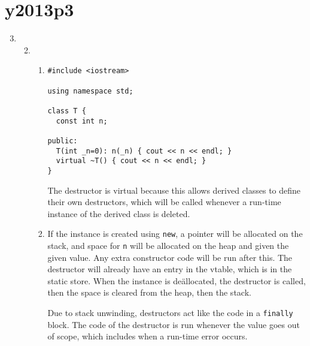 \documentclass{article}
\begin{document}
\section*{y2013p3}
\begin{enumerate}
\setcounter{enumi}{2}
  \item
    \begin{enumerate}
    \setcounter{enumii}{1}
      \item
        \begin{enumerate}
          \item \begin{lstlisting}
#include <iostream>

using namespace std;

class T {
  const int n;

public:
  T(int _n=0): n(_n) { cout << n << endl; }
  virtual ~T() { cout << n << endl; }
}
            \end{lstlisting}
            The destructor is virtual because this allows derived classes to define their own destructors, which will be called whenever a run-time instance of the derived class is deleted.
          \item If the instance is created using \texttt{new}, a pointer will be allocated on the stack, and space for \texttt{n} will be allocated on the heap and given the given value. Any extra constructor code will be run after this. The destructor will already have an entry in the vtable, which is in the static store. When the instance is de\"allocated, the destructor is called, then the space is cleared from the heap, then the stack.

            Due to stack unwinding, destructors act like the code in a \texttt{finally} block. The code of the destructor is run whenever the value goes out of scope, which includes when a run-time error occurs.
        \end{enumerate}
    \end{enumerate}
\end{enumerate}
\end{document}
